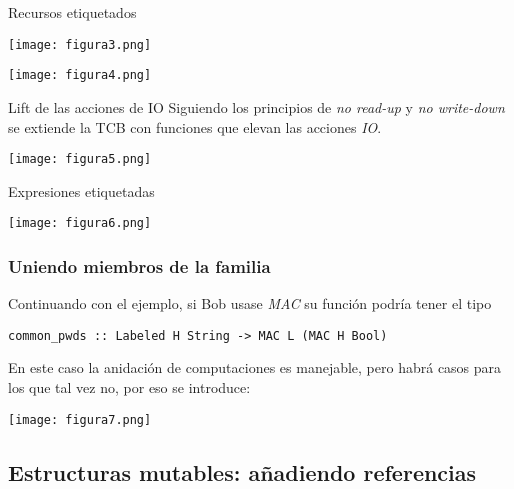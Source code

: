 \documentclass{beamer}
\begin{document}
\begin{frame}{Recursos etiquetados}
    
    \pause
    \begin{center}
        \texttt{[image: figura3.png]}
    \end{center}

    \pause[3]
    \begin{center}
        \texttt{[image: figura4.png]}
    \end{center}
\end{frame}

\begin{frame}{Lift de las acciones de IO}
    \pause
    Siguiendo los principios de \textit{no read-up} y \textit{no write-down} se extiende la TCB con funciones que elevan las acciones \textit{IO}.

    \pause[3]
    \begin{center}
        \texttt{[image: figura5.png]}
    \end{center}
\end{frame}

\begin{frame}{Expresiones etiquetadas}
    \pause
    \begin{center}
        \texttt{[image: figura6.png]}
    \end{center}
\end{frame}

\begin{frame}[fragile]
    \frametitle{Uniendo miembros de la familia}
    \pause
    Continuando con el ejemplo, si Bob usase \textit{MAC} su función podría tener el tipo

    \begin{lstlisting}
common_pwds :: Labeled H String -> MAC L (MAC H Bool)
    \end{lstlisting}
    
    \pause[3]
    En este caso la anidación de computaciones es manejable, pero habrá casos para los que tal vez no, por eso se introduce:

    \pause[4]
    \begin{center}
        \texttt{[image: figura7.png]}
    \end{center}
\end{frame}

\subsection{Estructuras mutables: añadiendo referencias}
\end{document}
